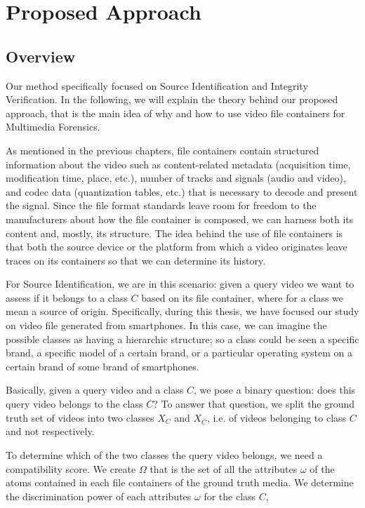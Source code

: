 \chapter{Proposed Approach}

\section{Overview}

Our method specifically focused on Source Identification and Integrity Verification. In the following, we will explain the theory behind our proposed approach, that is the main idea of why and how to use video file containers for Multimedia Forensics.

As mentioned in the previous chapters, file containers contain structured information about the video such as content-related metadata (acquisition time, modification time, place, etc.), number of tracks and signals (audio and video), and codec data (quantization tables, etc.) that is necessary to decode and present the signal. Since the file format standards leave room for freedom to the manufacturers about how the file container is composed, we can harness both its content and, mostly, its structure. The idea behind the use of file containers is that both the source device or the platform from which a video originates leave traces on its containers so that we can determine its history.

For Source Identification, we are in this scenario: given a query video we want to assess if it belongs to a class $C$ based on its file container, where for a class we mean a source of origin. Specifically, during this thesis, we have focused our study on video file generated from smartphones. In this case, we can imagine the possible classes as having a hierarchic structure; so a class could be seen a specific brand, a specific model of a certain brand, or a particular operating system on a certain brand of some brand of smartphones.

Basically, given a query video and a class $C$, we pose a binary question: does this query video belongs to the class $C$? To answer that question, we split the ground truth set of videos into two classes $X_{C}$ and $X_{\overline{C}}$, i.e. of videos belonging to class $C$ and not respectively.

To determine which of the two classes the query video belongs, we need a compatibility score. We create $\Omega$ that is the set of all the attributes $\omega$ of the atoms contained in each file containers of the ground truth media. We determine the discrimination power of each attributes $\omega$ for the class $C$,

